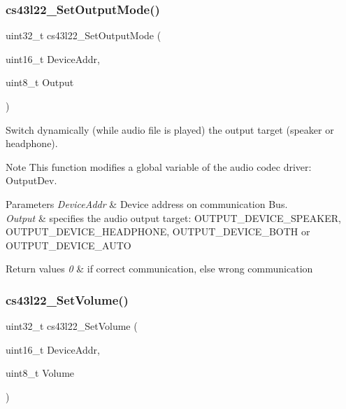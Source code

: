 \subsubsection{\texorpdfstring{cs43l22\+\_\+\+Set\+Output\+Mode()}{cs43l22\_SetOutputMode()}}
{\footnotesize\ttfamily uint32\+\_\+t cs43l22\+\_\+\+Set\+Output\+Mode (\begin{DoxyParamCaption}\item[{uint16\+\_\+t}]{Device\+Addr,  }\item[{uint8\+\_\+t}]{Output }\end{DoxyParamCaption})}



Switch dynamically (while audio file is played) the output target (speaker or headphone). 

\begin{DoxyNote}{Note}
This function modifies a global variable of the audio codec driver\+: Output\+Dev. 
\end{DoxyNote}

\begin{DoxyParams}{Parameters}
{\em Device\+Addr} & Device address on communication Bus. \\
\hline
{\em Output} & specifies the audio output target\+: O\+U\+T\+P\+U\+T\+\_\+\+D\+E\+V\+I\+C\+E\+\_\+\+S\+P\+E\+A\+K\+ER, O\+U\+T\+P\+U\+T\+\_\+\+D\+E\+V\+I\+C\+E\+\_\+\+H\+E\+A\+D\+P\+H\+O\+NE, O\+U\+T\+P\+U\+T\+\_\+\+D\+E\+V\+I\+C\+E\+\_\+\+B\+O\+TH or O\+U\+T\+P\+U\+T\+\_\+\+D\+E\+V\+I\+C\+E\+\_\+\+A\+U\+TO \\
\hline
\end{DoxyParams}

\begin{DoxyRetVals}{Return values}
{\em 0} & if correct communication, else wrong communication \\
\hline
\end{DoxyRetVals}
\mbox{\label{group___c_s43_l22___private___functions_ga9cd060bb226e44065ec50c7803041114}} 
\subsubsection{\texorpdfstring{cs43l22\+\_\+\+Set\+Volume()}{cs43l22\_SetVolume()}}
{\footnotesize\ttfamily uint32\+\_\+t cs43l22\+\_\+\+Set\+Volume (\begin{DoxyParamCaption}\item[{uint16\+\_\+t}]{Device\+Addr,  }\item[{uint8\+\_\+t}]{Volume }\end{DoxyParamCaption})}



